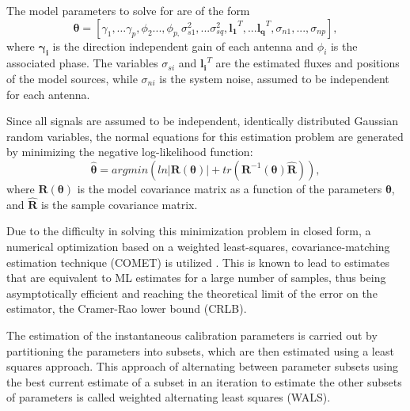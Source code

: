 \documentclass{aa}
\begin{document}
The model parameters to solve for are of the form
\begin{equation}
\bm{\theta}=[\gamma_{1},\ldots\gamma_{p},\phi_{2}...,\phi_{p,}\sigma_{s1}^{2},...\sigma_{sq}^{2},\mathbf{l_{1}}^{T},...\mathbf{l_{q}}^{T},\sigma_{n1},...,\sigma_{np}],\label{eq:estparam}
\end{equation}
 where $\mathbf{\gamma_{i}}$  is the direction independent gain  of each antenna
 and  $\phi_{i}$  is  the  associated  phase. The  variables  $\sigma_{si}$  and
 $\mathbf{l_i}^{T}$ are the estimated fluxes and positions of the model sources,
 while $\sigma_{ni}$  is the  system noise, assumed  to be independent  for each
 antenna.

Since  all  signals  are  assumed  to be  independent,  identically  distributed
Gaussian random variables, the normal  equations for this estimation problem are
generated by minimizing the negative log-likelihood function:
\begin{equation}
\bm{\hat{\theta}}=argmin\left(ln|\bm{R(\theta)}|+tr(\mathbf{R}^{-1}(\bm{\theta})\mathbf{\widehat{R}})\right),\label{eq:normeq}
\end{equation}
 where  $\bm{R(\theta)}$  is  the  model  covariance  matrix  as  a
 function of  the parameters $\bm{\theta}$,  and $\mathbf{\widehat{R}}$ is
 the sample covariance matrix.

Due to  the difficulty in  solving this minimization  problem in closed  form, a
numerical  optimization based on  a weighted  least-squares,  covariance-matching
estimation technique (COMET)  is utilized \citep{ottersten1998covariance}.  This
is known to  lead to estimates that  are equivalent to ML estimates  for a large
number  of  samples,  thus  being  asymptotically  efficient  and  reaching  the
theoretical  limit of the  error on  the estimator,  the Cramer-Rao  lower bound
(CRLB).

The estimation  of the  instantaneous calibration parameters  is carried  out by
partitioning the parameters into subsets, which are then estimated using a least
squares approach.  This approach  of alternating between parameter subsets using
the best  current estimate  of a subset  in an  iteration to estimate  the other
subsets of parameters is called weighted alternating least squares (WALS).
\end{document}
